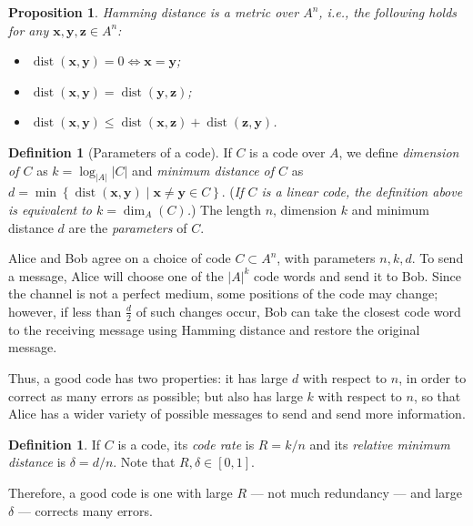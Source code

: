 \documentclass[11pt, oneside]{amsart}
\newtheorem{prop}[thm]{Proposition}
\theoremstyle{definition}
\newtheorem{defn}[thm]{Definition}
\theoremstyle{remark}
\numberwithin{equation}{section}
\DeclareMathOperator{\dist}{dist}
\DeclareMathOperator{\dimension}{dim}
\begin{document}
\begin{prop} \label{prop:hamming}
    Hamming distance is a metric over $A^n$, i.e., the following holds for any $\mathbf{x}, \mathbf{y}, \mathbf{z} \in A^n$:
    \begin{itemize}[noitemsep]
        \item $\dist(\mathbf{x}, \mathbf{y}) = 0 \iff \mathbf{x} = \mathbf{y}$;
        \item $\dist(\mathbf{x}, \mathbf{y}) = \dist(\mathbf{y}, \mathbf{z})$;
        \item $\dist(\mathbf{x}, \mathbf{y}) \le \dist(\mathbf{x}, \mathbf{z}) + \dist(\mathbf{z}, \mathbf{y})$.
    \end{itemize}
\end{prop}

\begin{defn}[Parameters of a code]
	If $C$ is a code over $A$, we define \emph{dimension of $C$} as $k = \log_{|A|}|C|$ and \emph{minimum distance of $C$} as $d = \min\left\{\dist(\mathbf{x}, \mathbf{y}) \mid \mathbf{x} \neq \mathbf{y} \in C\right\}$.
	(\emph{If $C$ is a linear code, the definition above is equivalent to $k = \dimension_{A}(C)$.})
	The length $n$, dimension $k$ and minimum distance $d$ are the \emph{parameters} of $C$.
\end{defn}

Alice and Bob agree on a choice of code $C \subset A^n$, with parameters $n, k, d$.
To send a message, Alice will choose one of the $|A|^k$ code words and send it to Bob.
Since the channel is not a perfect medium, some positions of the code may change;
however, if less than $\frac{d}{2}$ of such changes occur, Bob can take the closest code word to the receiving message using Hamming distance and restore the original message.

Thus, a good code has two properties: it has large $d$ with respect to $n$, in order to correct as many errors as possible;
but also has large $k$ with respect to $n$, so that Alice has a wider variety of possible messages to send and send more information.

\begin{defn}
	If $C$ is a code, its \emph{code rate} is $R = k/n$ and its \emph{relative minimum distance} is $\delta = d/n$.
	Note that $R, \delta \in [0, 1]$.
\end{defn}

Therefore, a good code is one with large $R$ --- not much redundancy --- and large $\delta$ --- corrects many errors. 
\end{document}
